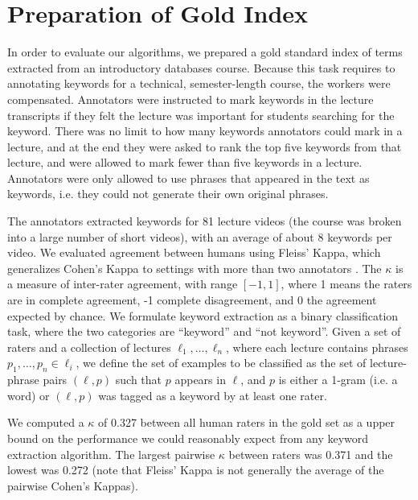 \section{Preparation of Gold Index}
\label{sec:gold}


In order to evaluate our algorithms, we prepared a gold standard index of terms extracted from an introductory databases course. Because this task requires to annotating keywords for a technical, semester-length course, the workers were compensated. Annotators were instructed to mark keywords in the lecture transcripts if they felt the lecture was important for students searching for the keyword. There was no limit to how many keywords annotators could mark in a lecture, and at the end they were asked to rank the top five keywords from that lecture, and were allowed to mark fewer than five keywords in a lecture. Annotators were only allowed to use phrases that appeared in the text as keywords, i.e. they could not generate their own original phrases.

The annotators extracted keywords for 81 lecture videos (the course was broken into a large number of short videos), with an average of about 8 keywords per video. We evaluated agreement between humans using Fleiss' Kappa, which generalizes Cohen's Kappa to settings with more than two annotators \cite{fleiss1971measuring}. The $\kappa$ is a measure of inter-rater agreement, with range $[-1, 1]$, where 1 means the raters are in complete agreement, -1 complete disagreement, and 0 the agreement expected by chance. We formulate keyword extraction as a binary classification task, where the two categories are ``keyword'' and ``not keyword''. Given a set of raters and a collection of lectures $\ell_1, \ldots, \ell_n$, where each lecture contains phrases $p_1, \ldots, p_n \in \ell_i$, we define the set of examples to be classified as the set of lecture-phrase pairs $(\ell, p)$ such that $p$ appears in $\ell$, and $p$ is either a 1-gram (i.e. a word) or $(\ell, p)$ was tagged as a keyword by at least one rater. 

We computed a $\kappa$ of 0.327 between all human raters in the gold set as a upper bound on the performance we could reasonably expect from any keyword extraction algorithm. The largest pairwise $\kappa$ between raters was 0.371 and the lowest was 0.272 (note that Fleiss' Kappa is not generally the average of the pairwise Cohen's Kappas).
